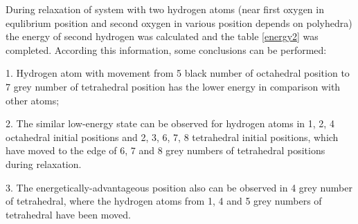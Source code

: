 During relaxation of system with two hydrogen atoms (near first oxygen in equlibrium position and second oxygen in various position depends on polyhedra) the energy of second hydrogen was calculated and the table \ref{energy2} was completed. According this information, some conclusions can be performed:

1. Hydrogen atom with movement from 5 black number of octahedral position to 7 grey number of tetrahedral position has the lower energy in comparison with other atoms;

2. The similar low-energy state can be observed for hydrogen atoms in 1, 2, 4 octahedral initial positions and 2, 3, 6, 7, 8 tetrahedral initial positions, which have moved to the edge of 6, 7 and 8 grey numbers of tetrahedral positions during relaxation.

3. The energetically-advantageous position also can be observed in 4 grey number of tetrahedral, where the hydrogen atoms from 1, 4 and 5 grey numbers of tetrahedral have been moved.


